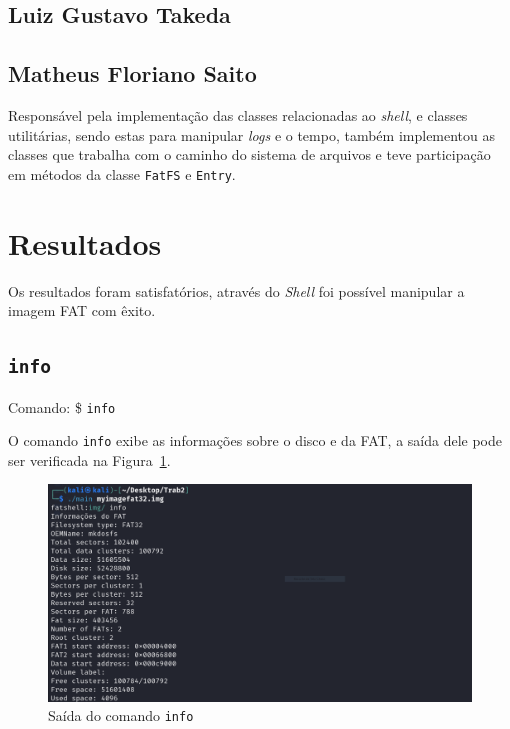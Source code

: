 \documentclass[
    12pt,				%
    oneside,   	        %
    a4paper,			%
    english,			%
    french,				%
    spanish,			%
    brazil,				%
    ]{pacotes/abntex2}
\begin{document}
\subsection{Luiz Gustavo Takeda}
\label{subsec:luizinho}

\subsection{Matheus Floriano Saito}
\label{subsec:peixoto}
Responsável pela implementação das classes relacionadas ao \textit{shell}, e classes utilitárias, sendo estas para manipular \textit{logs} e o tempo, também implementou as classes que trabalha com o caminho do sistema de arquivos e teve participação em métodos da classe \texttt{FatFS} e \texttt{Entry}.



\graphicspath{ {./figuras/resultados} }

\section{Resultados}
\label{sec:resultados}
Os resultados foram satisfatórios, através do \textit{Shell} foi possível manipular a imagem FAT com êxito.


\subsection{\texttt{info}}
\label{subsec:info}
Comando: \$ \texttt{info}
 
O comando \texttt{info} exibe as informações sobre o disco e da FAT, a saída dele pode ser verificada na Figura~\ref{fig:info}.

\begin{figure}[H]
    \centering
    \includegraphics[width=450pt]{0-info.PNG}
    \caption{Saída do comando \texttt{info}}
    \label{fig:info}
\end{figure}
\end{document}
